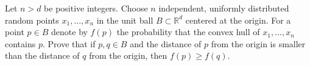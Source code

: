 \documentclass{article}
\begin{document}
\setlength{\parindent}{0pt}
Let $n>d$ be positive integers. Choose $n$ independent, uniformly distributed random points $x_1,\ldots,x_n$ in the unit ball $B\subset \mathbb{R}^d$ centered at the origin. For a point $p\in B$ denote by $f(p)$ the probability that the convex hull of $x_1,\ldots,x_n$ contains $p$. Prove that if $p,q\in B$ and the distance of $p$ from the origin is smaller than the distance of $q$ from the origin, then $f(p)\geq f(q)$.
\end{document}
